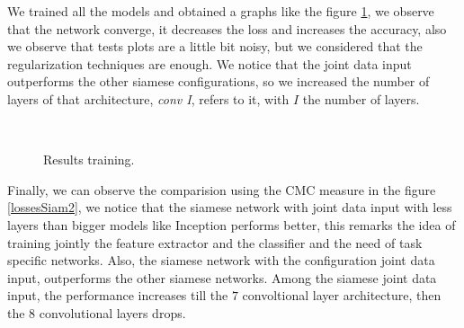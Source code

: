 We trained all the models and obtained a graphs like the figure \ref{lossesSiam}, we observe that the network converge, it decreases the loss and increases the accuracy, also we observe that tests plots are a little bit noisy, but we considered that the  regularization techniques are enough. We notice that the joint data input outperforms the other siamese configurations, so we increased the number of layers of that architecture, \textit{conv I}, refers to it, with $I$ the number of layers.

\begin{figure}[H]
		
\centering

\\

\caption{Results training.}
\label{lossesSiam}
\end{figure}



Finally, we can observe the comparision using the CMC measure in the figure \ref{lossesSiam2}, we notice that the siamese network with joint data input with less layers than bigger models like Inception performs better, this remarks the idea of training jointly the feature extractor and the classifier and the need of task specific networks. Also, the siamese network with the configuration joint data input, outperforms the other siamese networks. Among the siamese joint data input, the performance increases till the $7$ convoltional layer architecture, then the $8$ convolutional layers drops.


